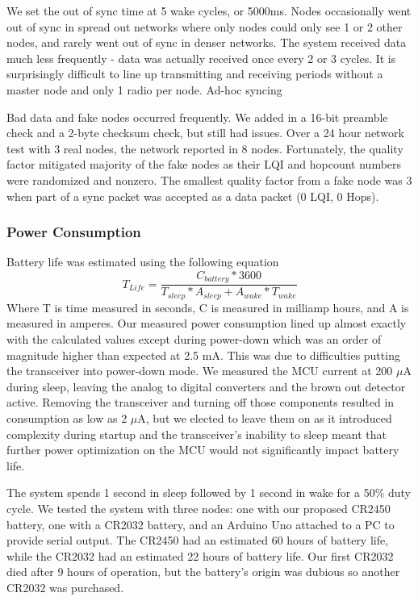 We set the out of sync time at 5 wake cycles, or 5000ms. Nodes occasionally went out of sync in spread out networks where only nodes could only see 1 or 2 other nodes, and rarely went out of sync in denser networks. The system received data much less frequently - data was actually received once every 2 or 3 cycles. It is surprisingly difficult to line up transmitting and receiving periods without a master node and only 1 radio per node. Ad-hoc syncing 

Bad data and fake nodes occurred  frequently. We added in a 16-bit preamble check and a 2-byte checksum check, but still had issues. Over a 24 hour network test with 3 real nodes, the network reported in 8 nodes. Fortunately, the quality factor mitigated majority of the fake nodes as their LQI and hopcount numbers were randomized and nonzero. The smallest quality factor from a fake node was 3 when part of a sync packet was accepted as a data packet (0 LQI, 0 Hops).

\subsubsection{Power Consumption}
Battery life was estimated using the following equation
\[T_{Life}=\frac{C_{battery} * 3600}{T_{sleep}*A_{sleep} + A_{wake}*T_{wake}}\] Where T is time measured in seconds, C is measured in milliamp hours, and A is measured in amperes.
Our measured power consumption lined up almost exactly with the calculated values except during power-down which was an order of magnitude higher than expected at 2.5 mA. This was due to difficulties putting the transceiver into power-down mode. We measured the MCU current at 200 $\mu$A during sleep, leaving the analog to digital converters and the brown out detector active. Removing the transceiver and turning off those components resulted in consumption as low as 2 $\mu$A, but we elected to leave them on as it introduced complexity during startup and the transceiver's inability to sleep meant that further power optimization on the MCU would not significantly impact battery life.

The system spends 1 second in sleep followed by 1 second in wake for a 50\% duty cycle. We tested the system with three nodes: one with our proposed CR2450 battery, one with a CR2032 battery, and an Arduino Uno attached to a PC to provide serial output. The CR2450 had an estimated 60 hours of battery life, while the CR2032 had an estimated 22 hours of battery life. Our first CR2032 died after 9 hours of operation, but the battery's origin was dubious so another CR2032 was purchased.

